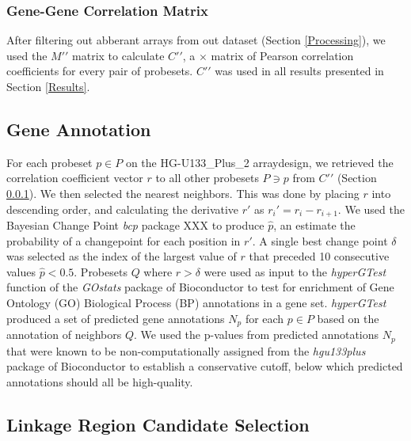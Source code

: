 \documentclass{article}
\begin{document}

\subsubsection{Gene-Gene Correlation Matrix}\label{Correlation}

After filtering out abberant arrays from out dataset (Section
\ref{Processing}), we used the $M\prime\prime$ matrix to calculate
$C\prime\prime$, a  $\times$  matrix of Pearson
correlation coefficients for every pair of probesets.  $C\prime\prime$ was used
in all results presented in Section \ref{Results}.

\subsection{Gene Annotation}\label{Annotation Methods}

For each probeset $p \in P$ on the HG-U133\_Plus\_2 arraydesign, we retrieved
the correlation coefficient vector $r$ to all other probesets $P \ni p$ from
$C\prime\prime$ (Section \ref{Correlation}).  We then selected the nearest
neighbors.  This was done by placing $r$ into descending order, and calculating
the derivative $r\prime$ as ${r_i}\prime = r_i - r_{i+1}$.  We used the
Bayesian Change Point \emph{bcp} package XXX to produce $\hat{p}$, an
estimate the probability of a changepoint for each position in $r\prime$.  A
single best change point $\delta$ was selected as the index of the largest
value of $r$ that preceded 10 consecutive values $\hat{p} < 0.5$.  Probesets $Q$
where $r > \delta$ were used as input to the \emph{hyperGTest} function of
the \emph{GOstats} package of Bioconductor \cite{bioconductor} to test for
enrichment of Gene Ontology (GO) Biological Process (BP) annotations in a gene
set.  \emph{hyperGTest} produced a set of predicted gene annotations $N_p$ for
each $p \in P$ based on the annotation of neighbors $Q$.  We used the p-values
from predicted annotations $N_p$ that were known to be  non-computationally
assigned from the \emph{hgu133plus} package of Bioconductor \cite{bioconductor}
to establish a conservative cutoff, below which predicted annotations should
all be high-quality.

\subsection{Linkage Region Candidate Selection}\label{Linkage}
\end{document}
